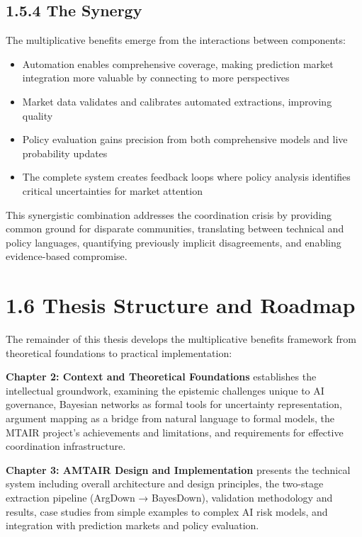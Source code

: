 \documentclass[
  11pt,
  letterpaper,
]{book}
\providecommand{\tightlist}{%
  \setlength{\itemsep}{0pt}\setlength{\parskip}{0pt}}
\begin{document}
\subsection{1.5.4 The Synergy}\label{the-synergy}

The multiplicative benefits emerge from the interactions between
components:

\begin{itemize}
\tightlist
\item
  Automation enables comprehensive coverage, making prediction market
  integration more valuable by connecting to more perspectives
\item
  Market data validates and calibrates automated extractions, improving
  quality
\item
  Policy evaluation gains precision from both comprehensive models and
  live probability updates
\item
  The complete system creates feedback loops where policy analysis
  identifies critical uncertainties for market attention
\end{itemize}

This synergistic combination addresses the coordination crisis by
providing common ground for disparate communities, translating between
technical and policy languages, quantifying previously implicit
disagreements, and enabling evidence-based compromise.

\section{1.6 Thesis Structure and
Roadmap}\label{thesis-structure-and-roadmap}

The remainder of this thesis develops the multiplicative benefits
framework from theoretical foundations to practical implementation:

\textbf{Chapter 2: Context and Theoretical Foundations} establishes the
intellectual groundwork, examining the epistemic challenges unique to AI
governance, Bayesian networks as formal tools for uncertainty
representation, argument mapping as a bridge from natural language to
formal models, the MTAIR project's achievements and limitations, and
requirements for effective coordination infrastructure.

\textbf{Chapter 3: AMTAIR Design and Implementation} presents the
technical system including overall architecture and design principles,
the two-stage extraction pipeline (ArgDown → BayesDown), validation
methodology and results, case studies from simple examples to complex AI
risk models, and integration with prediction markets and policy
evaluation.
\end{document}
